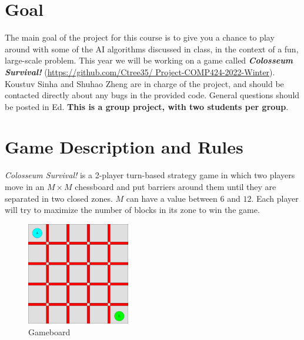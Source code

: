 \documentclass[twoside,11pt]{article}
\begin{document}

\section{Goal}

The main goal of the project for this course is to give you a chance to play around with some of the AI algorithms discussed in class, in the context of a fun, large-scale problem. This year we will be working on a game called \textbf{\textit{Colosseum Survival!}} (\href{https://github.com/Ctree35/Project-COMP424-2022-Winter}{https://github.com/Ctree35/ Project-COMP424-2022-Winter}). Koustuv Sinha and Shuhao Zheng are in charge of the project, and should be contacted directly about any bugs in the provided code. General questions should be posted in Ed. \textbf{This is a group project, with two students per group}.

\section{Game Description and Rules}
\textit{Colosseum Survival!} is a 2-player turn-based strategy game in which two players move in an $M\times M$ chessboard and put barriers around them until they are separated in two closed zones. $M$ can have a value between $6$ and $12$.
Each player will try to maximize the number of blocks in its zone to win the game.

\begin{figure}[!h]
    \centering
    \includegraphics[width=0.4\textwidth]{Gameboard.png}
    \caption{Gameboard}
\end{figure}
\end{document}
